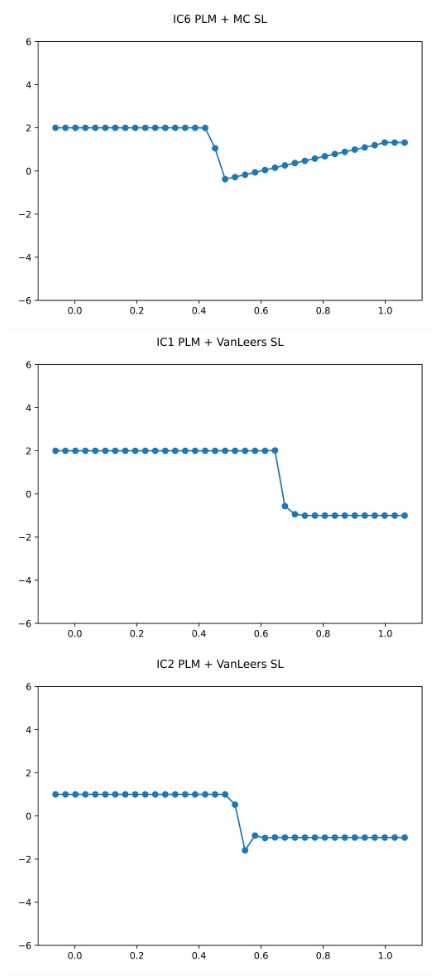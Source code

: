 \documentclass{article}
\begin{document}
\begin{figure}[t]
        \includegraphics[width=.95\textwidth]{../../code/IC6Methodpo_plot.png}
    \emp
        \centering
        \includegraphics[width=.95\textwidth]{../../code/IC1Methodpv_plot.png}
        \includegraphics[width=.95\textwidth]{../../code/IC2Methodpv_plot.png}

\end{figure}
\end{document}
